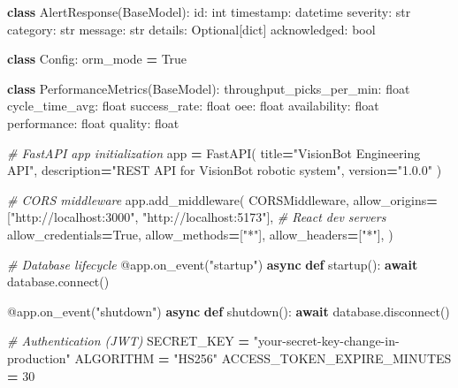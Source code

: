 \documentclass[
]{article}
\newenvironment{Shaded}{\begin{snugshade}}{\end{snugshade}}
\newcommand{\AttributeTok}[1]{\textcolor[rgb]{0.13,0.29,0.53}{#1}}
\newcommand{\BuiltInTok}[1]{#1}
\newcommand{\CommentTok}[1]{\textcolor[rgb]{0.56,0.35,0.01}{\textit{#1}}}
\newcommand{\ControlFlowTok}[1]{\textcolor[rgb]{0.13,0.29,0.53}{\textbf{#1}}}
\newcommand{\DecValTok}[1]{\textcolor[rgb]{0.00,0.00,0.81}{#1}}
\newcommand{\ExtensionTok}[1]{#1}
\newcommand{\KeywordTok}[1]{\textcolor[rgb]{0.13,0.29,0.53}{\textbf{#1}}}
\newcommand{\NormalTok}[1]{#1}
\newcommand{\OperatorTok}[1]{\textcolor[rgb]{0.81,0.36,0.00}{\textbf{#1}}}
\newcommand{\StringTok}[1]{\textcolor[rgb]{0.31,0.60,0.02}{#1}}
\newcommand{\VariableTok}[1]{\textcolor[rgb]{0.00,0.00,0.00}{#1}}
\begin{document}
\begin{Shaded}
\begin{Highlighting}[]
\KeywordTok{class}\NormalTok{ AlertResponse(BaseModel):}
    \BuiltInTok{id}\NormalTok{: }\BuiltInTok{int}
\NormalTok{    timestamp: datetime}
\NormalTok{    severity: }\BuiltInTok{str}
\NormalTok{    category: }\BuiltInTok{str}
\NormalTok{    message: }\BuiltInTok{str}
\NormalTok{    details: Optional[}\BuiltInTok{dict}\NormalTok{]}
\NormalTok{    acknowledged: }\BuiltInTok{bool}

    \KeywordTok{class}\NormalTok{ Config:}
\NormalTok{        orm\_mode }\OperatorTok{=} \VariableTok{True}

\KeywordTok{class}\NormalTok{ PerformanceMetrics(BaseModel):}
\NormalTok{    throughput\_picks\_per\_min: }\BuiltInTok{float}
\NormalTok{    cycle\_time\_avg: }\BuiltInTok{float}
\NormalTok{    success\_rate: }\BuiltInTok{float}
\NormalTok{    oee: }\BuiltInTok{float}
\NormalTok{    availability: }\BuiltInTok{float}
\NormalTok{    performance: }\BuiltInTok{float}
\NormalTok{    quality: }\BuiltInTok{float}

\CommentTok{\# FastAPI app initialization}
\NormalTok{app }\OperatorTok{=}\NormalTok{ FastAPI(}
\NormalTok{    title}\OperatorTok{=}\StringTok{"VisionBot Engineering API"}\NormalTok{,}
\NormalTok{    description}\OperatorTok{=}\StringTok{"REST API for VisionBot robotic system"}\NormalTok{,}
\NormalTok{    version}\OperatorTok{=}\StringTok{"1.0.0"}
\NormalTok{)}

\CommentTok{\# CORS middleware}
\NormalTok{app.add\_middleware(}
\NormalTok{    CORSMiddleware,}
\NormalTok{    allow\_origins}\OperatorTok{=}\NormalTok{[}\StringTok{"http://localhost:3000"}\NormalTok{, }\StringTok{"http://localhost:5173"}\NormalTok{],  }\CommentTok{\# React dev servers}
\NormalTok{    allow\_credentials}\OperatorTok{=}\VariableTok{True}\NormalTok{,}
\NormalTok{    allow\_methods}\OperatorTok{=}\NormalTok{[}\StringTok{"*"}\NormalTok{],}
\NormalTok{    allow\_headers}\OperatorTok{=}\NormalTok{[}\StringTok{"*"}\NormalTok{],}
\NormalTok{)}

\CommentTok{\# Database lifecycle}
\AttributeTok{@app.on\_event}\NormalTok{(}\StringTok{"startup"}\NormalTok{)}
\ControlFlowTok{async} \KeywordTok{def}\NormalTok{ startup():}
    \ControlFlowTok{await}\NormalTok{ database.}\ExtensionTok{connect}\NormalTok{()}

\AttributeTok{@app.on\_event}\NormalTok{(}\StringTok{"shutdown"}\NormalTok{)}
\ControlFlowTok{async} \KeywordTok{def}\NormalTok{ shutdown():}
    \ControlFlowTok{await}\NormalTok{ database.disconnect()}

\CommentTok{\# Authentication (JWT)}
\NormalTok{SECRET\_KEY }\OperatorTok{=} \StringTok{"your{-}secret{-}key{-}change{-}in{-}production"}
\NormalTok{ALGORITHM }\OperatorTok{=} \StringTok{"HS256"}
\NormalTok{ACCESS\_TOKEN\_EXPIRE\_MINUTES }\OperatorTok{=} \DecValTok{30}


\end{Highlighting}
\end{Shaded}
\end{document}
